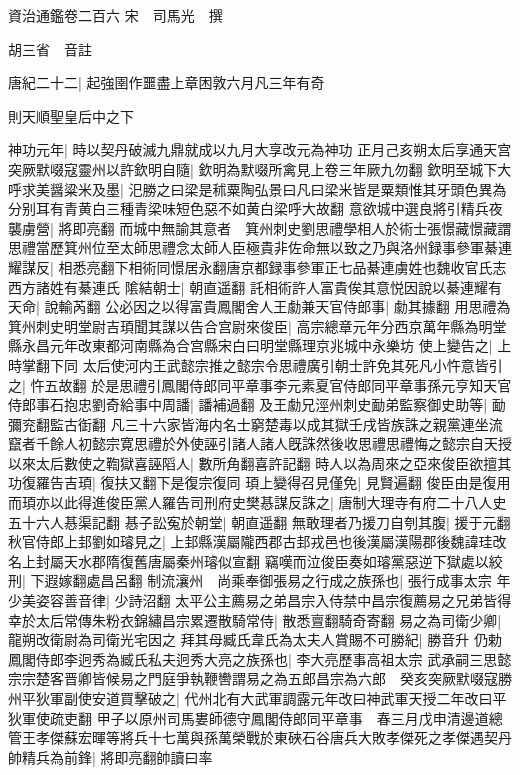 資治通鑑卷二百六
宋　司馬光　撰

胡三省　音註

唐紀二十二|{
	起強圉作噩盡上章困敦六月凡三年有奇}


則天順聖皇后中之下

神功元年|{
	時以契丹破滅九鼎就成以九月大享改元為神功}
正月己亥朔太后享通天宫　突厥默啜寇靈州以許欽明自隨|{
	欽明為默啜所禽見上卷三年厥九勿翻}
欽明至城下大呼求美醤粱米及墨|{
	汜勝之曰梁是秫粟陶弘景曰凡曰梁米皆是粟類惟其牙頭色異為分别耳有青黄白三種青梁味短色惡不如黄白梁呼大故翻}
意欲城中選良將引精兵夜襲虜營|{
	將即亮翻}
而城中無諭其意者　箕州刺史劉思禮學相人於術士張憬藏憬藏謂思禮當歷箕州位至太師思禮念太師人臣極貴非佐命無以致之乃與洛州録事參軍綦連耀謀反|{
	相悉亮翻下相術同憬居永翻唐京都録事參軍正七品綦連虜姓也魏收官氏志西方諸姓有綦連氏}
隂結朝士|{
	朝直遥翻}
託相術許人富貴俟其意悦因說以綦連耀有天命|{
	說輸芮翻}
公必因之以得富貴鳳閣舍人王勮兼天官侍郎事|{
	勮其據翻}
用思禮為箕州刺史明堂尉吉頊聞其謀以告合宫尉來俊臣|{
	高宗總章元年分西京萬年縣為明堂縣永昌元年改東都河南縣為合宫縣宋白曰明堂縣理京兆城中永樂坊}
使上變告之|{
	上時掌翻下同}
太后使河内王武懿宗推之懿宗令思禮廣引朝士許免其死凡小忤意皆引之|{
	忤五故翻}
於是思禮引鳳閣侍郎同平章事李元素夏官侍郎同平章事孫元亨知天官侍郎事石抱忠劉奇給事中周譒|{
	譒補過翻}
及王勮兄涇州刺史勔弟監察御史助等|{
	勔彌兖翻監古衘翻}
凡三十六家皆海内名士窮楚毒以成其獄壬戌皆族誅之親黨連坐流竄者千餘人初懿宗寛思禮於外使誣引諸人諸人旣誅然後收思禮思禮悔之懿宗自天授以來太后數使之鞫獄喜誣䧟人|{
	數所角翻喜許記翻}
時人以為周來之亞來俊臣欲擅其功復羅告吉頊|{
	復扶又翻下是復宗復同}
頊上變得召見僅免|{
	見賢遍翻}
俊臣由是復用而頊亦以此得進俊臣黨人羅告司刑府史樊惎謀反誅之|{
	唐制大理寺有府二十八人史五十六人惎渠記翻}
惎子訟寃於朝堂|{
	朝直遥翻}
無敢理者乃援刀自刳其腹|{
	援于元翻}
秋官侍郎上邽劉如璿見之|{
	上邽縣漢屬隴西郡古邽戎邑也後漢屬漢陽郡後魏諱珪改名上封屬天水郡隋復舊唐屬秦州璿似宣翻}
竊嘆而泣俊臣奏如璿黨惡逆下獄處以絞刑|{
	下遐嫁翻處昌呂翻}
制流瀼州　尚乘奉御張易之行成之族孫也|{
	張行成事太宗}
年少美姿容善音律|{
	少詩沼翻}
太平公主薦易之弟昌宗入侍禁中昌宗復薦易之兄弟皆得幸於太后常傳朱粉衣錦繡昌宗累遷散騎常侍|{
	散悉亶翻騎奇寄翻}
易之為司衛少卿|{
	龍朔改衛尉為司衛光宅因之}
拜其母臧氏韋氏為太夫人賞賜不可勝紀|{
	勝音升}
仍勅鳳閣侍郎李迥秀為臧氏私夫迥秀大亮之族孫也|{
	李大亮歷事高祖太宗}
武承嗣三思懿宗宗楚客晋卿皆候易之門庭爭執鞭轡謂易之為五郎昌宗為六郎　癸亥突厥默啜寇勝州平狄軍副使安道買擊破之|{
	代州北有大武軍調露元年改曰神武軍天授二年改曰平狄軍使疏吏翻}
甲子以原州司馬婁師德守鳳閣侍郎同平章事　春三月戊申清邊道總管王孝傑蘇宏暉等將兵十七萬與孫萬榮戰於東硤石谷唐兵大敗孝傑死之孝傑遇契丹帥精兵為前鋒|{
	將即亮翻帥讀曰率}
